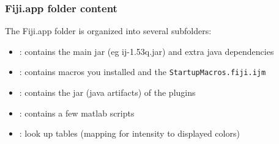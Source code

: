 \documentclass[ignorenonframetext,aspectratio=169,10pt,xcolor=table]{beamer}
\begin{document}
\begin{frame}  \frametitle{Fiji.app folder content}

  The Fiji.app folder is organized into several subfolders:

  \begin{itemize} \setlength\itemsep{1em}
  \item {}: contains the main jar (eg ij-1.53q.jar) and
    extra java dependencies
  \item {}: contains macros you installed and the
    \texttt{StartupMacros.fiji.ijm}
  \item {}: contains the jar (java artifacts) of the
    plugins
  \item {}: contains a few matlab scripts
  \item {}: look up tables (mapping for intensity to displayed
    colors)
  \end{itemize}

\end{frame}
\end{document}
